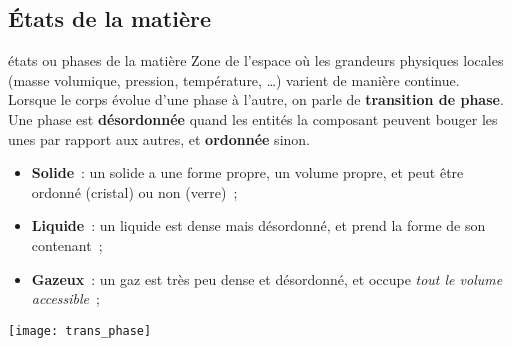 \documentclass[../main/main.tex]{subfiles}
\begin{document}
\subsection{États de la matière}
\begin{defi}[label=def:etat, sidebyside, righthand ratio=.6]
    {états ou phases de la matière}
    Zone de l'espace où les grandeurs physiques locales (masse volumique,
    pression, température, …) varient de manière continue.
    Lorsque le corps évolue d’une phase à l'autre, on parle de
    \textbf{transition de phase}.\bigbreak
    Une phase est \textbf{désordonnée} quand les entités la composant peuvent
    bouger les unes par rapport aux autres, et \textbf{ordonnée} sinon.
    \tcblower
    \begin{itemize}
        \item \textbf{Solide}~: un solide a une forme propre, un volume
            propre, et peut être ordonné (cristal) ou non (verre)~;
        \item \textbf{Liquide}~: un liquide est dense mais désordonné,
            et prend la forme de son contenant~;
        \item \textbf{Gazeux}~: un gaz est très peu dense et désordonné, et
            occupe \textit{tout le volume accessible}~;
    \end{itemize}
    \begin{center}
        \texttt{[image: trans\_phase]}
    \end{center}
\end{defi}
\end{document}
